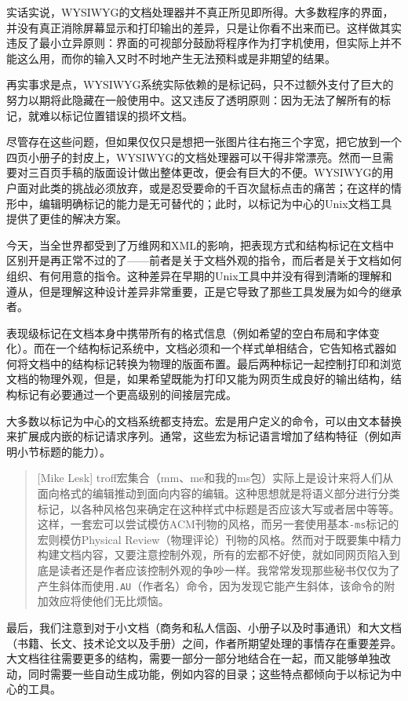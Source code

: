 \documentclass[12pt,oneside]{book}
\begin{document}
\begin{common-format}
实话实说，WYSIWYG的文档处理器并不真正所见即所得。大多数程序的界面，并没有真正消除屏幕显示和打印输出的差异，只是让你看不出来而已。这样做其实违反了最小立异原则：界面的可视部分鼓励将程序作为打字机使用，但实际上并不能这么用，而你的输入又时不时地产生无法预料或是非期望的结果。

再实事求是点，WYSIWYG系统实际依赖的是标记码，只不过额外支付了巨大的努力以期将此隐藏在一般使用中。这又违反了透明原则：因为无法了解所有的标记，就难以标记位置错误的损坏文档。

尽管存在这些问题，但如果仅仅只是想把一张图片往右拖三个字宽，把它放到一个四页小册子的封皮上，WYSIWYG的文档处理器可以干得非常漂亮。然而一旦需要对三百页手稿的版面设计做出整体更改，便会有巨大的不便。WYSIWYG的用户面对此类的挑战必须放弃，或是忍受要命的千百次鼠标点击的痛苦；在这样的情形中，编辑明确标记的能力是无可替代的；此时，以标记为中心的Unix文档工具提供了更佳的解决方案。

今天，当全世界都受到了万维网和XML的影响，把表现方式和结构标记在文档中区别开是再正常不过的了——前者是关于文档外观的指令，而后者是关于文档如何组织、有何用意的指令。这种差异在早期的Unix工具中并没有得到清晰的理解和遵从，但是理解这种设计差异非常重要，正是它导致了那些工具发展为如今的继承者。

表现级标记在文档本身中携带所有的格式信息（例如希望的空白布局和字体变化）。而在一个结构标记系统中，文档必须和一个样式单相结合，它告知格式器如何将文档中的结构标记转换为物理的版面布置。最后两种标记一起控制打印和浏览文档的物理外观，但是，如果希望既能为打印又能为网页生成良好的输出结构，结构标记有必要通过一个更高级别的间接层完成。

大多数以标记为中心的文档系统都支持宏。宏是用户定义的命令，可以由文本替换来扩展成内嵌的标记请求序列。通常，这些宏为标记语言增加了结构特征（例如声明小节标题的能力）。

\begin{quote}[Mike Lesk]
troff宏集合（mm、me和我的ms包）实际上是设计来将人们从面向格式的编辑推动到面向内容的编辑。这种思想就是将语义部分进行分类标记，以各种风格包来确定在这种样式中标题是否应该大写或者居中等等。这样，一套宏可以尝试模仿ACM刊物的风格，而另一套使用基本\verb+-ms+标记的宏则模仿Physical Review（物理评论）刊物的风格。然而对于既要集中精力构建文档内容，又要注意控制外观，所有的宏都不好使，就如同网页陷入到底是读者还是作者应该控制外观的争吵一样。我常常发现那些秘书仅仅为了产生斜体而使用\verb+.AU+（作者名）命令，因为发现它能产生斜体，该命令的附加效应将使他们无比烦恼。
\end{quote}

最后，我们注意到对于小文档（商务和私人信函、小册子以及时事通讯）和大文档（书籍、长文、技术论文以及手册）之间，作者所期望处理的事情存在重要差异。大文档往往需要更多的结构，需要一部分一部分地结合在一起，而又能够单独改动，同时需要一些自动生成功能，例如内容的目录；这些特点都倾向于以标记为中心的工具。


\end{common-format}
\end{document}
